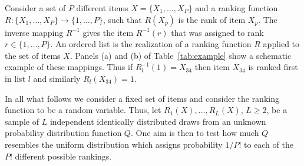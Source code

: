 \documentclass[12pt,a4paper]{article}
\theoremstyle{plain}
\begin{document}
Consider a set of $P$ different items $X=\{X_1,\dots,X_P\}$ and a
ranking function $R: \{X_1,\dots,X_P\}\to \{1,\dots,P\}$, such that
$R(X_p)$ is the rank of item $X_p$. The inverse mapping $R^{-1}$ gives
the item $R^{-1}(r)$ that was assigned to rank $r\in\{1,\dots,P\}$. An
ordered list is the realization of a ranking function $R$ applied to
the set of items $X$.  Panels (a) and (b) of Table~\ref{tab:example}
show a schematic example of these mappings. Thus if
$R_l^{-1}(1)=X_{34}$ then item $X_{34}$ is ranked first in list $l$
and similarly $R_l(X_{34})=1$.

In all what follows we consider a fixed set of items and consider the
ranking function to be a random variable. Thus, let
$R_1(X),\dots,R_L(X)$, $L\geq2$, be a sample of $L$ independent
identically distributed draws from an unknown probability distribution
function $Q$. One aim is then to test how much $Q$ resembles the
uniform distribution which assigns probability $1/P!$ to each of
the $P!$ different possible rankings.
\end{document}
